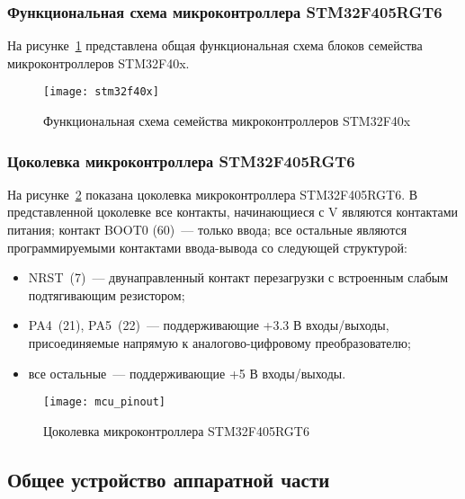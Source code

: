 \documentclass[document.tex]{subfiles}
\begin{document}
\clearpage
\subsubsection{Функциональная схема микроконтроллера STM32F405RGT6}
На рисунке~\ref{fig:mcu} представлена общая функциональная схема блоков семейства микрокон\-троллеров STM32F40x.
\begin{figure}[h]
\centering
\texttt{[image: stm32f40x]}
\caption{Функциональная схема семейства микроконтроллеров STM32F40x}
\label{fig:mcu}
\end{figure}

\clearpage
\subsubsection{Цоколевка микроконтроллера STM32F405RGT6}
На рисунке~\ref{fig:mcu_pinout} показана цоколевка микроконтроллера STM32F405RGT6. В представленной цоколевке все контакты, начинающиеся с V являются контак\-тами питания;
контакт BOOT0 (60)~--- только ввода; все остальные являются програм\-мируемыми контактами ввода-вывода со следующей структурой:
\begin{itemize}
	\item NRST~(7)~--- двунаправленный контакт перезагрузки с встроенным слабым подтягива\-ющим резистором;
	\item PA4~(21), PA5~(22)~--- поддерживающие +3.3 В входы/выходы, присоеди\-няемые напрямую к аналогово-цифровому преобразователю;
	\item все остальные~--- поддерживающие +5 В входы/выходы.\cite{mcu}
\end{itemize}

\begin{figure}[h]
\centering
\texttt{[image: mcu\_pinout]}
\caption{Цоколевка микроконтроллера STM32F405RGT6}
\label{fig:mcu_pinout}
\end{figure}

\clearpage
\subsection{Общее устройство аппаратной части}
\end{document}

